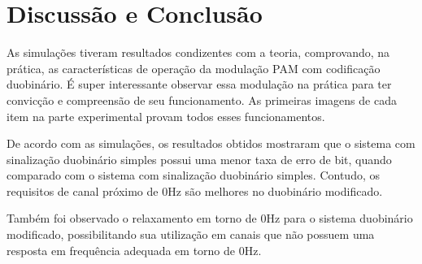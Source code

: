 \newpage
\section{Discussão e Conclusão}
As simulações tiveram resultados condizentes com a teoria, comprovando, na 
prática, as características de operação da modulação PAM com codificação 
duobinário. É super interessante observar essa modulação na prática para ter 
convicção e compreensão de seu funcionamento. As primeiras imagens de cada item 
na parte experimental provam todos esses funcionamentos.

De acordo com as simulações, os resultados obtidos mostraram que o sistema com 
sinalização duobinário simples possui uma menor taxa de erro de bit, quando 
comparado com o sistema com sinalização duobinário simples. Contudo, os 
requisitos de canal próximo de 0Hz são melhores no duobinário modificado.

Também foi observado o relaxamento em torno de 0Hz para o sistema duobinário 
modificado, possibilitando sua utilização em canais que não possuem uma 
resposta em frequência adequada em torno de 0Hz.